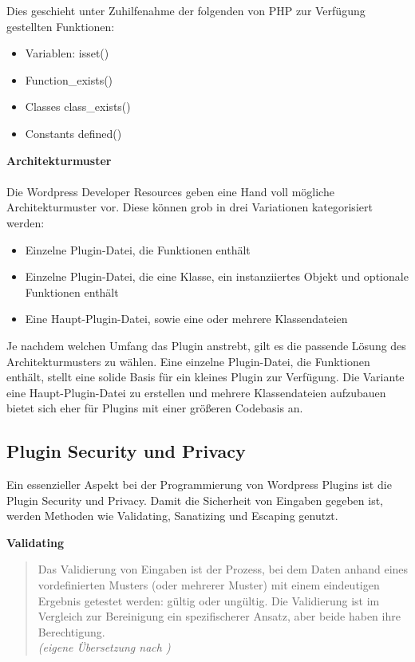 Dies geschieht unter Zuhilfenahme der folgenden von PHP zur Verfügung gestellten Funktionen:
\begin{itemize}
 \item Variablen: isset()
 \item Function\_exists() %
 \item Classes class\_exists()
 \item Constants defined()
\end{itemize}
\vspace{1em}
\textbf{Architekturmuster}\\\\
Die Wordpress Developer Resources geben eine Hand voll mögliche Architekturmuster vor.
Diese können grob in drei Variationen kategorisiert werden:
\begin{itemize}
 \item Einzelne Plugin-Datei, die Funktionen enthält
 \item Einzelne Plugin-Datei, die eine Klasse, ein instanziiertes Objekt und optionale Funktionen enthält
 \item Eine Haupt-Plugin-Datei, sowie eine oder mehrere Klassendateien
\end{itemize}

Je nachdem welchen Umfang das Plugin anstrebt, gilt es die passende Lösung des Architekturmusters zu wählen.
Eine einzelne Plugin-Datei, die Funktionen enthält, stellt eine solide Basis für ein kleines Plugin zur Verfügung.
Die Variante eine Haupt-Plugin-Datei zu erstellen und mehrere Klassendateien aufzubauen bietet sich eher für Plugins mit einer größeren Codebasis an.

\subsection{Plugin Security und Privacy}
Ein essenzieller Aspekt bei der Programmierung von Wordpress Plugins ist die Plugin Security und Privacy.
Damit die Sicherheit von Eingaben gegeben ist, werden Methoden wie Validating, Sanatizing und Escaping genutzt.

\textbf{Validating}

\begin{quote}
 Das Validierung von Eingaben ist der Prozess, bei dem Daten anhand eines vordefinierten Musters (oder mehrerer Muster) mit einem eindeutigen Ergebnis getestet werden: gültig oder ungültig.
 Die Validierung ist im Vergleich zur Bereinigung ein spezifischerer Ansatz, aber beide haben ihre Berechtigung.
 \\[0.5em]
 \emph{(eigene Übersetzung nach \cite{wordpress2024plugin_validation})}
\end{quote}

